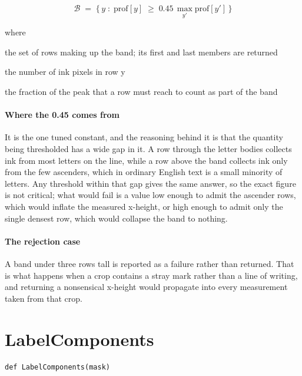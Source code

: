 \begin{equation}
\mathcal{B} \;=\; \Big\{\, y \;:\; \mathrm{prof}[y] \;\ge\; 0.45\,\max_{y'} \mathrm{prof}[y'] \,\Big\}
\end{equation}

\noindent where
\begin{description}[leftmargin=2.4em,style=nextline,font=\normalfont\ttfamily]\setlength\itemsep{1pt}
  \item[{$\mathcal{B}$}] \normalfont the set of rows making up the band; its first and last members are returned
  \item[{$\mathrm{prof}[y]$}] \normalfont the number of ink pixels in row y
  \item[{$0.45$}] \normalfont the fraction of the peak that a row must reach to count as part of the band
\end{description}

\paragraph{Where the 0.45 comes from}
It is the one tuned constant, and the reasoning behind it is that the quantity being thresholded has a wide gap in it. A row through the letter bodies collects ink from most letters on the line, while a row above the band collects ink only from the few ascenders, which in ordinary English text is a small minority of letters. Any threshold within that gap gives the same answer, so the exact figure is not critical; what would fail is a value low enough to admit the ascender rows, which would inflate the measured x-height, or high enough to admit only the single densest row, which would collapse the band to nothing.


\paragraph{The rejection case}
A band under three rows tall is reported as a failure rather than returned. That is what happens when a crop contains a stray mark rather than a line of writing, and returning a nonsensical x-height would propagate into every measurement taken from that crop.


\section{LabelComponents}
\begin{lstlisting}[style=sig]
def LabelComponents(mask)
\end{lstlisting}

